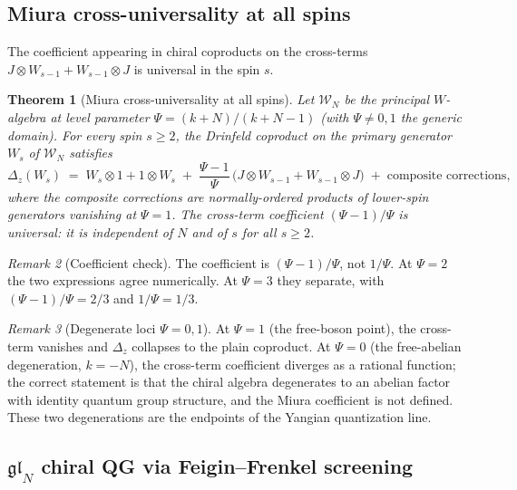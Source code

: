 \documentclass[11pt]{article}
\theoremstyle{plain}
\newtheorem{theorem}{Theorem}[section]
\theoremstyle{definition}
\theoremstyle{remark}
\newtheorem{remark}[theorem]{Remark}
\newcommand{\cW}{\mathcal{W}}
\begin{document}
\subsection{Miura cross-universality at all spins}\label{sec:miura-sf}

The coefficient appearing in chiral coproducts on the cross-terms
$J \otimes W_{s-1} + W_{s-1}\otimes J$ is universal in the spin $s$.

\begin{theorem}[Miura cross-universality at all
spins]\label{thm:miura-cross-universality-sf}
\ClaimStatusProvedElsewhere
Let $\cW_N$ be the principal $W$-algebra at level parameter
$\Psi = (k + N)/(k + N - 1)$ (with $\Psi \neq 0,1$ the generic
domain). For every spin $s \geq 2$, the Drinfeld coproduct on the
primary generator $W_s$ of $\cW_N$ satisfies
\[
 \Delta_z(W_s) \;=\; W_s \otimes 1 + 1 \otimes W_s
 \;+\; \frac{\Psi - 1}{\Psi}\,\bigl(J \otimes W_{s-1} + W_{s-1}\otimes J\bigr)
 \;+\; \text{composite corrections},
\]
where the composite corrections are normally-ordered products of
lower-spin generators vanishing at $\Psi = 1$. The cross-term
coefficient $(\Psi-1)/\Psi$ is \emph{universal}: it is independent of
$N$ and of $s$ for all $s \geq 2$.
\end{theorem}

\begin{remark}[Coefficient check]\label{rem:miura-retraction-sf}
The coefficient is $(\Psi-1)/\Psi$, not $1/\Psi$. At
$\Psi = 2$ the two expressions agree numerically. At
$\Psi = 3$ they separate, with $(\Psi-1)/\Psi = 2/3$ and
$1/\Psi = 1/3$.
\end{remark}

\begin{remark}[Degenerate loci $\Psi = 0, 1$]\label{rem:miura-degen-sf}
At $\Psi = 1$ (the free-boson point), the cross-term vanishes and
$\Delta_z$ collapses to the plain coproduct. At $\Psi = 0$ (the
free-abelian degeneration, $k = -N$), the cross-term coefficient
diverges as a rational function; the correct statement is that the
chiral algebra degenerates to an abelian factor with identity
quantum group structure, and the Miura coefficient is not defined.
These two degenerations are the endpoints of the Yangian
quantization line.
\end{remark}

\subsection{$\mathfrak{gl}_N$ chiral QG via Feigin--Frenkel screening}
\label{sec:glN-ff-sf}
\end{document}
